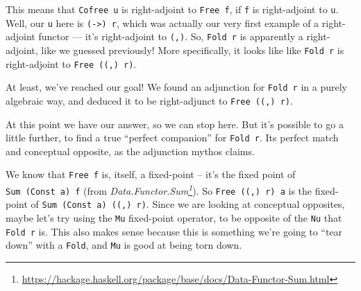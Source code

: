 \documentclass[]{article}
\renewcommand{\href}[2]{#2\footnote{\url{#1}}}
\begin{document}
This means that \texttt{Cofree\ u} is right-adjoint to \texttt{Free\ f}, if
\texttt{f} is right-adjoint to \texttt{u}. Well, our \texttt{u} here is
\texttt{(-\textgreater{})\ r}, which was actually our very first example of a
right-adjoint functor --- it's right-adjoint to \texttt{(,)}. So,
\texttt{Fold\ r} is apparently a right-adjoint, like we guessed previously! More
specifically, it looks like like \texttt{Fold\ r} is right-adjoint to
\texttt{Free\ ((,)\ r)}.

At least, we've reached our goal! We found an adjunction for \texttt{Fold\ r} in
a purely algebraic way, and deduced it to be right-adjunct to
\texttt{Free\ ((,)\ r)}.

At this point we have our answer, so we can stop here. But it's possible to go a
little further, to find a true ``perfect companion'' for \texttt{Fold\ r}. Its
perfect match and conceptual opposite, as the adjunction mythos claims.

We know that \texttt{Free\ f} is, itself, a fixed-point -- it's the fixed point
of \texttt{Sum\ (Const\ a)\ f} (from
\emph{\href{https://hackage.haskell.org/package/base/docs/Data-Functor-Sum.html}{Data.Functor.Sum}}).
So \texttt{Free\ ((,)\ r)\ a} is the fixed-point of
\texttt{Sum\ (Const\ a)\ ((,)\ r)}. Since we are looking at conceptual
opposites, maybe let's try using the \texttt{Mu} fixed-point operator, to be
opposite of the \texttt{Nu} that \texttt{Fold\ r} is. This also makes sense
because this is something we're going to ``tear down'' with a \texttt{Fold}, and
\texttt{Mu} is good at being torn down.
\end{document}
